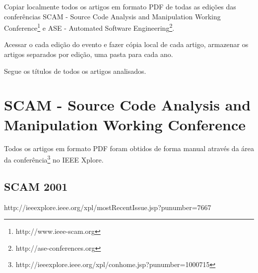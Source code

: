 
Copiar localmente todos os artigos em formato PDF de todas as edições das
conferências SCAM - Source Code Analysis and Manipulation Working
Conference\footnote{http://www.ieee-scam.org} e ASE - Automated Software
Engineering\footnote{http://ase-conferences.org}.

Acessar o cada edição do evento e fazer cópia local de
cada artigo, armazenar os artigos separados por edição, uma pasta para
cada ano.

Segue os títulos de todos os artigos analisados.

%
%
%
%
%
%
%


\section{SCAM - Source Code Analysis and Manipulation Working Conference}

Todos os artigos em formato PDF foram obtidos de forma manual através da área
da
conferência\footnote{http://ieeexplore.ieee.org/xpl/conhome.jsp?punumber=1000715}
no IEEE Xplore.

\subsection{SCAM 2001}

http://ieeexplore.ieee.org/xpl/mostRecentIssue.jsp?punumber=7667

